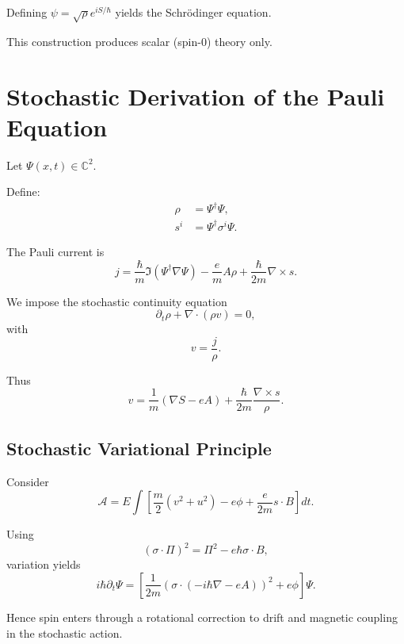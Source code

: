 \documentclass[12pt]{article}
\begin{document}
Defining $\psi=\sqrt{\rho}e^{iS/\hbar}$ yields the Schr\"odinger equation.

This construction produces scalar (spin-0) theory only.

\section{Stochastic Derivation of the Pauli Equation}

Let $\Psi(x,t)\in\mathbb{C}^2$.

Define:
\begin{align}
\rho &= \Psi^\dagger\Psi,\\
s^i &= \Psi^\dagger\sigma^i\Psi.
\end{align}

The Pauli current is
\begin{equation}
j =
\frac{\hbar}{m}\Im(\Psi^\dagger\nabla\Psi)
- \frac{e}{m}A\rho
+ \frac{\hbar}{2m}\nabla\times s.
\end{equation}

We impose the stochastic continuity equation
\begin{equation}
\partial_t \rho + \nabla\cdot(\rho v)=0,
\end{equation}
with
\begin{equation}
v=\frac{j}{\rho}.
\end{equation}

Thus
\begin{equation}
v=\frac{1}{m}(\nabla S - eA)
+ \frac{\hbar}{2m}\frac{\nabla\times s}{\rho}.
\end{equation}

\subsection{Stochastic Variational Principle}

Consider
\begin{equation}
\mathcal{A}
=
E\int
\left[
\frac{m}{2}(v^2+u^2)
- e\phi
+ \frac{e}{2m}s\cdot B
\right] dt.
\end{equation}

Using
\[
(\sigma\cdot\Pi)^2
=
\Pi^2 - e\hbar\sigma\cdot B,
\]
variation yields
\begin{equation}
i\hbar\partial_t\Psi
=
\left[
\frac{1}{2m}(\sigma\cdot(-i\hbar\nabla-eA))^2
+ e\phi
\right]\Psi.
\end{equation}

Hence spin enters through a rotational correction to drift and
magnetic coupling in the stochastic action.
\end{document}
